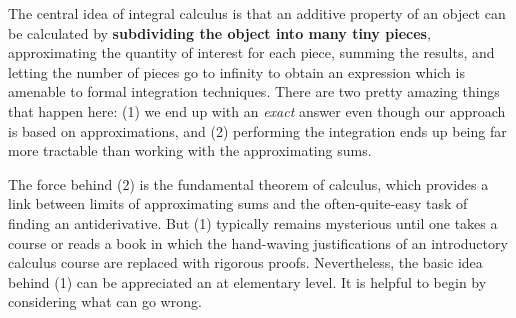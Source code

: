 \documentclass[svgnames]{watsonbook}
\begin{document}
The central idea of integral calculus is that an additive property of
an object can be calculated by \textbf{subdividing the object into
  many tiny pieces}, approximating the quantity of interest for each
piece, summing the results, and letting the number of pieces go to
infinity to obtain an expression which is amenable to formal
integration techniques. There are two pretty amazing things that
happen here: (1) we end up with an \textit{exact} answer even though
our approach is based on approximations, and (2) performing the
integration ends up being far more tractable than working with the
approximating sums.

The force behind (2) is the fundamental theorem of calculus, which
provides a link between limits of approximating sums and the
often-quite-easy task of finding an antiderivative. But (1) typically
remains mysterious until one takes a course or reads a book in
which the hand-waving justifications of an introductory calculus course
are replaced with rigorous proofs. Nevertheless, the basic idea behind
(1) can be appreciated an at elementary level. It is helpful to begin
by considering what can go wrong. 
\end{document}
